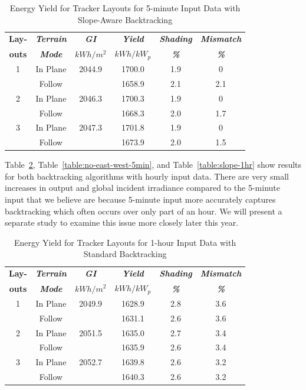 \documentclass[conference]{IEEEtran}
\begin{document}
\begin{table}[htbp]
\caption{Energy Yield for Tracker Layouts for 5-minute Input Data with Slope-Aware Backtracking}
\begin{center}
\begin{tabular}{|c|c|c|c|c|c|}
\hline
\textbf{Lay-}& \textbf{\textit{Terrain}}& \textbf{\textit{GI}}&        \textbf{\textit{Yield}}&        \textbf{\textit{Shading}}& \textbf{\textit{Mismatch}} \\
\textbf{outs}& \textbf{\textit{Mode}}&    \textbf{\textit{$kWh/m^2$}}& \textbf{\textit{$kWh / kW_p$}}& \textbf{\textit{\%}}&      \textbf{\textit{\%}} \\
\hline
1& In Plane& 2044.9&  1700.0& 1.9& 0 \\
 & Follow&         &  1658.9& 2.1& 2.1 \\
\hline
2& In Plane& 2046.3&  1700.3& 1.9& 0 \\
 & Follow&         &  1668.3& 2.0& 1.7 \\
\hline
3& In Plane& 2047.3&  1701.8& 1.9& 0 \\
 & Follow&         &  1673.9& 2.0& 1.5 \\
\hline
\end{tabular}
\label{table:slope-5min}
\end{center}
\end{table}

Table~\ref{table:standard-1hr}, Table~\ref{table:no-east-west-5min}, and Table~\ref{table:slope-1hr} show results for both backtracking algorithms with hourly input data. There are very small increases in output and global incident irradiance compared to the 5-minute input that we believe are because 5-minute input more accurately captures backtracking which often occurs over only part of an hour. We will present a separate study to examine this issue more closely later this year.

\begin{table}[htbp]
\caption{Energy Yield for Tracker Layouts for 1-hour Input Data with Standard Backtracking}
\begin{center}
\begin{tabular}{|c|c|c|c|c|c|}
\hline
\textbf{Lay-}& \textbf{\textit{Terrain}}& \textbf{\textit{GI}}&        \textbf{\textit{Yield}}&        \textbf{\textit{Shading}}& \textbf{\textit{Mismatch}} \\
\textbf{outs}& \textbf{\textit{Mode}}&    \textbf{\textit{$kWh/m^2$}}& \textbf{\textit{$kWh / kW_p$}}& \textbf{\textit{\%}}&      \textbf{\textit{\%}} \\
\hline
1& In Plane& 2049.9&  1628.9& 2.8& 3.6 \\
 & Follow&         &  1631.1& 2.6& 3.6 \\
\hline
2& In Plane& 2051.5&  1635.0& 2.7& 3.4 \\
 & Follow&         &  1635.9& 2.6& 3.4 \\
\hline
3& In Plane& 2052.7&  1639.8& 2.6& 3.2 \\
 & Follow&         &  1640.3& 2.6& 3.2 \\
\hline
\end{tabular}
\label{table:standard-1hr}
\end{center}
\end{table}
\end{document}
